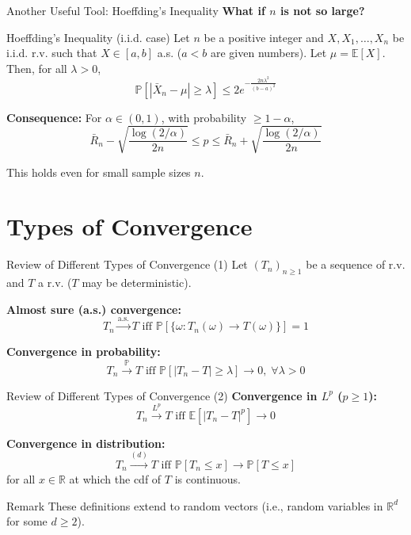 \documentclass[aspectratio=169]{beamer}
\begin{document}
\begin{frame}{Another Useful Tool: Hoeffding's Inequality}
\textbf{What if $n$ is not so large?}

\vspace{0.3cm}

\begin{block}{Hoeffding's Inequality (i.i.d. case)}
Let $n$ be a positive integer and $X, X_1, \ldots, X_n$ be i.i.d. r.v. such that $X \in [a, b]$ a.s. ($a < b$ are given numbers). Let $\mu = \mathbb{E}[X]$. Then, for all $\lambda > 0$,
\[\mathbb{P}[|\bar{X}_n - \mu| \geq \lambda] \leq 2e^{-\frac{2n\lambda^2}{(b-a)^2}}\]
\end{block}

\vspace{0.3cm}

\textbf{Consequence:} For $\alpha \in (0, 1)$, with probability $\geq 1 - \alpha$,
\[\bar{R}_n - \sqrt{\frac{\log(2/\alpha)}{2n}} \leq p \leq \bar{R}_n + \sqrt{\frac{\log(2/\alpha)}{2n}}\]

This holds even for small sample sizes $n$.
\end{frame}

\section{Types of Convergence}

\begin{frame}{Review of Different Types of Convergence (1)}
Let $(T_n)_{n\geq 1}$ be a sequence of r.v. and $T$ a r.v. ($T$ may be deterministic).

\vspace{0.5cm}

\textbf{Almost sure (a.s.) convergence:}
\[T_n \xrightarrow{\text{a.s.}} T \text{ iff } \mathbb{P}[\{\omega : T_n(\omega) \to T(\omega)\}] = 1\]

\vspace{0.5cm}

\textbf{Convergence in probability:}
\[T_n \xrightarrow{\mathbb{P}} T \text{ iff } \mathbb{P}[|T_n - T| \geq \lambda] \to 0, \; \forall \lambda > 0\]
\end{frame}

\begin{frame}{Review of Different Types of Convergence (2)}
\textbf{Convergence in $L^p$ ($p \geq 1$):}
\[T_n \xrightarrow{L^p} T \text{ iff } \mathbb{E}[|T_n - T|^p] \to 0\]

\vspace{0.5cm}

\textbf{Convergence in distribution:}
\[T_n \xrightarrow{(d)} T \text{ iff } \mathbb{P}[T_n \leq x] \to \mathbb{P}[T \leq x]\]
for all $x \in \mathbb{R}$ at which the cdf of $T$ is continuous.

\vspace{0.5cm}

\begin{block}{Remark}
These definitions extend to random vectors (i.e., random variables in $\mathbb{R}^d$ for some $d \geq 2$).
\end{block}
\end{frame}
\end{document}
